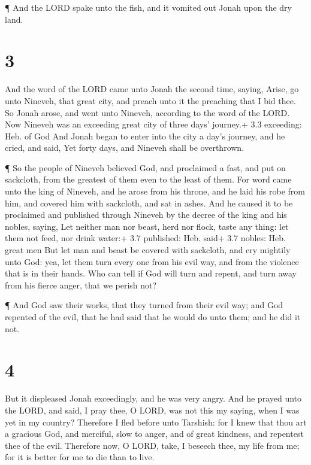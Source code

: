  ¶ And the LORD spake unto the fish, and it vomited out
Jonah upon the dry land.

\hypertarget{section-2}{%
\section{3}\label{section-2}}

 And the word of the LORD came unto Jonah the second time,
saying,  Arise, go unto Nineveh, that great city, and preach
unto it the preaching that I bid thee.  So Jonah arose, and
went unto Nineveh, according to the word of the LORD. Now Nineveh was an
exceeding great city of three days' journey.+ 3.3 exceeding: Heb. of God
 And Jonah began to enter into the city a day's journey, and
he cried, and said, Yet forty days, and Nineveh shall be overthrown.

 ¶ So the people of Nineveh believed God, and proclaimed a
fast, and put on sackcloth, from the greatest of them even to the least
of them.  For word came unto the king of Nineveh, and he
arose from his throne, and he laid his robe from him, and covered him
with sackcloth, and sat in ashes.  And he caused it to be
proclaimed and published through Nineveh by the decree of the king and
his nobles, saying, Let neither man nor beast, herd nor flock, taste any
thing: let them not feed, nor drink water:+ 3.7 published: Heb. said+
3.7 nobles: Heb. great men  But let man and beast be covered
with sackcloth, and cry mightily unto God: yea, let them turn every one
from his evil way, and from the violence that is in their hands.
 Who can tell if God will turn and repent, and turn away
from his fierce anger, that we perish not?

 ¶ And God saw their works, that they turned from their
evil way; and God repented of the evil, that he had said that he would
do unto them; and he did it not.

\hypertarget{section-3}{%
\section{4}\label{section-3}}

 But it displeased Jonah exceedingly, and he was very angry.
 And he prayed unto the LORD, and said, I pray thee, O LORD,
was not this my saying, when I was yet in my country? Therefore I fled
before unto Tarshish: for I knew that thou art a gracious God, and
merciful, slow to anger, and of great kindness, and repentest thee of
the evil.  Therefore now, O LORD, take, I beseech thee, my
life from me; for it is better for me to die than to live.

